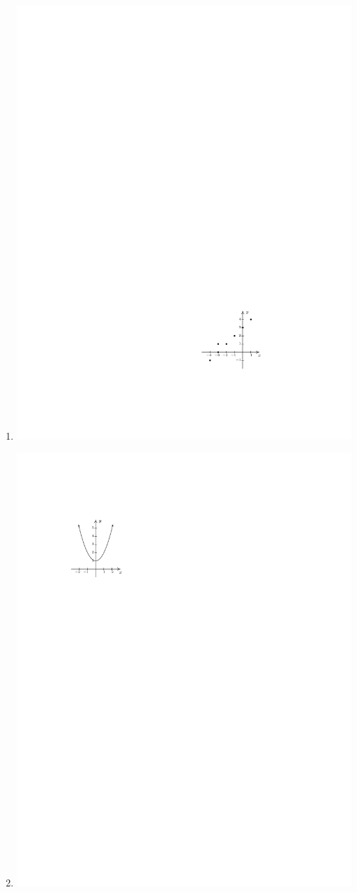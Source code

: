 \documentclass{ximera}
\begin{document}
\begin{exercise}
\begin{enumerate}
\item{\includegraphics{WiaFgraphs1-2.pdf}}
\item{\includegraphics{WiaFgraphs1-3.pdf}}

\end{enumerate}
\end{exercise}
\end{document}
